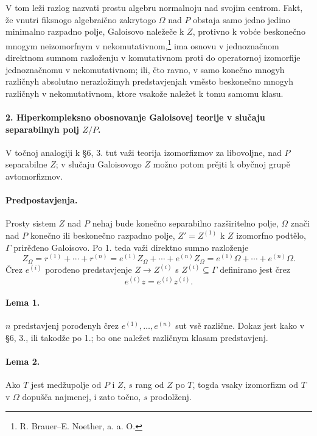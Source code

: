 \documentclass[11pt]{article}
\begin{document}
V tom leži razlog nazvati prostu algebru normalnoju nad svojim centrom. Fakt, že vnutri fiksnogo algebraično zakrytogo \(\Omega\) nad \(P\) obstaja samo jedno jedino minimalno razpadno polje, Galoisovo naležeče k \(Z\), protivno k vobće beskonečno mnogym neizomorfnym v nekomutativnom,\footnote{R. Brauer--E. Noether, a. a. O.} ima osnovu v jednoznačnom direktnom sumnom razloženju v komutativnom proti do operatornoj izomorfije jednoznačnomu v nekomutativnom; ili, čto ravno, v samo konečno mnogyh različnyh absolutno nerazložimyh predstavjenjah vměsto beskonečno mnogyh različnyh v nekomutativnom, ktore vsakože naležet k tomu samomu klasu.

\paragraph{2. Hiperkompleksno obosnovanje Galoisovej teorije v slučaju separabilnyh polj \(Z/P\).}
V točnoj analogiji k §6, 3. tut važi teorija izomorfizmov za libovoljne, nad \(P\) separabilne \(Z\); v slučaju Galoisovogo \(Z\) možno potom prějti k obyčnoj grupě avtomorfizmov.

\paragraph{Predpostavjenja.}
Prosty sistem \(Z\) nad \(P\) nehaj bude konečno separabilno razširitelno polje, \(\Omega\) znači nad \(P\) konečno ili beskonečno razpadno polje, \(Z'=Z^{(1)}\) k \(Z\) izomorfno podtělo, \(\Gamma\) prirěđeno Galoisovo. Po 1. teda važi direktno sumno razloženje
\[
        Z_\Omega=r^{(1)}+\cdots+r^{(n)}
        =e^{(1)}Z_\Omega+\cdots+e^{(n)}Z_\Omega
        =e^{(1)}\Omega+\cdots+e^{(n)}\Omega .
\]
Črez \(e^{(i)}\) porođeno predstavjenje \(Z\to Z^{(i)}\) s \(Z^{(i)}\subseteq\Gamma\) definirano jest črez
\[
        e^{(i)}z=e^{(i)}z^{(i)}.
\]

\paragraph{Lema 1.}
\(n\) predstavjenj porođenyh črez \(e^{(1)},\ldots,e^{(n)}\) sut vsě različne. Dokaz jest kako v §6, 3., ili takodže po 1.; bo one naležet različnym klasam predstavjenj.

\paragraph{Lema 2.}
Ako \(T\) jest medžupolje od \(P\) i \(Z\), \(s\) rang od \(Z\) po \(T\), togda vsaky izomorfizm od \(T\) v \(\Omega\) dopušča najmenej, i zato točno, \(s\) prodolženj.
\end{document}
